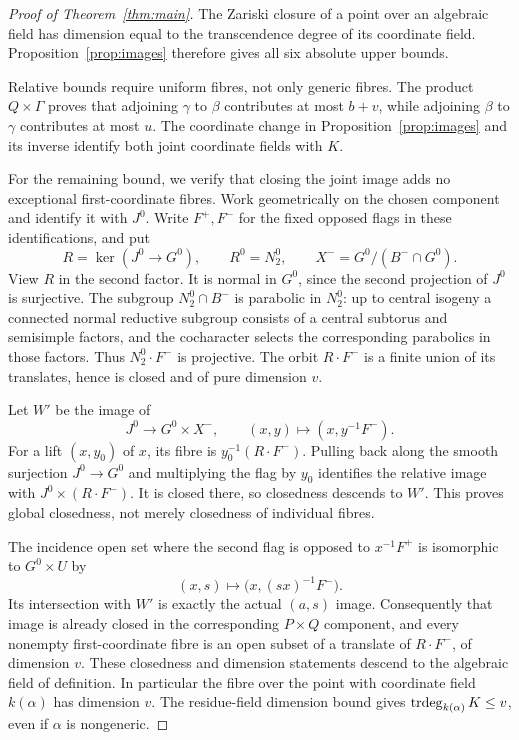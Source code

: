 \documentclass[11pt]{article}
\theoremstyle{definition}\newtheorem{definition}[theorem]{Definition}
\theoremstyle{remark}\newtheorem{remark}[theorem]{Remark}
\begin{document}
\begin{proof}[Proof of Theorem~\ref{thm:main}]
The Zariski closure of a point over an algebraic field has dimension equal to the transcendence degree of its coordinate field. Proposition~\ref{prop:images} therefore gives all six absolute upper bounds.

Relative bounds require uniform fibres, not only generic fibres. The product $Q\times\Gamma$ proves that adjoining $\gamma$ to $\beta$ contributes at most $b+v$, while adjoining $\beta$ to $\gamma$ contributes at most $u$. The coordinate change in Proposition~\ref{prop:images} and its inverse identify both joint coordinate fields with $K$.

For the remaining bound, we verify that closing the joint image adds no exceptional first-coordinate fibres. Work geometrically on the chosen component and identify it with $J^0$. Write $F^+,F^-$ for the fixed opposed flags in these identifications, and put
\[
 R=\ker(J^0\longrightarrow G^0),\qquad R^0=N_2^0,
 \qquad X^-=G^0/(B^-\cap G^0).
\]
View $R$ in the second factor. It is normal in $G^0$, since the second projection of $J^0$ is surjective. The subgroup $N_2^0\cap B^-$ is parabolic in $N_2^0$: up to central isogeny a connected normal reductive subgroup consists of a central subtorus and semisimple factors, and the cocharacter selects the corresponding parabolics in those factors. Thus $N_2^0\cdot F^-$ is projective. The orbit $R\cdot F^-$ is a finite union of its translates, hence is closed and of pure dimension $v$.

Let $W'$ be the image of
\[
 J^0\longrightarrow G^0\times X^-,\qquad
 (x,y)\longmapsto(x,y^{-1}F^-).
\]
For a lift $(x,y_0)$ of $x$, its fibre is $y_0^{-1}(R\cdot F^-)$. Pulling back along the smooth surjection $J^0\to G^0$ and multiplying the flag by $y_0$ identifies the relative image with $J^0\times(R\cdot F^-)$. It is closed there, so closedness descends to $W'$. This proves global closedness, not merely closedness of individual fibres.

The incidence open set where the second flag is opposed to $x^{-1}F^+$ is isomorphic to $G^0\times U$ by
\[
 (x,s)\longmapsto\bigl(x,(sx)^{-1}F^-\bigr).
\]
Its intersection with $W'$ is exactly the actual $(a,s)$ image. Consequently that image is already closed in the corresponding $P\times Q$ component, and every nonempty first-coordinate fibre is an open subset of a translate of $R\cdot F^-$, of dimension $v$. These closedness and dimension statements descend to the algebraic field of definition. In particular the fibre over the point with coordinate field $k(\alpha)$ has dimension $v$. The residue-field dimension bound gives $\operatorname{trdeg}_{k(\alpha)}K\leq v$, even if $\alpha$ is nongeneric.


\end{proof}
\end{document}
